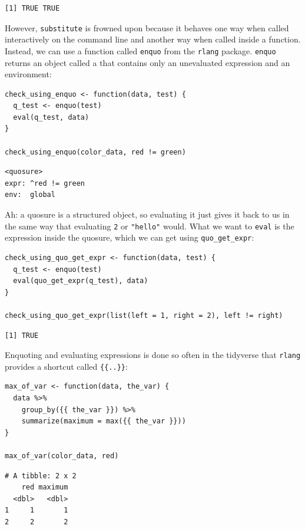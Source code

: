 \begin{lstlisting}
[1] TRUE TRUE
\end{lstlisting}

\noindent
However,
\texttt{substitute} is frowned upon because it behaves one way when called interactively on the command line
and another way when called inside a function.
Instead,
we can use a function called \texttt{enquo} from the \texttt{rlang} package.
\texttt{enquo} returns an object called a 
that contains only an unevaluated expression and an environment:

\begin{lstlisting}
check_using_enquo <- function(data, test) {
  q_test <- enquo(test)
  eval(q_test, data)
}

check_using_enquo(color_data, red != green)
\end{lstlisting}

\begin{lstlisting}
<quosure>
expr: ^red != green
env:  global
\end{lstlisting}

\noindent
Ah: a quosure is a structured object,
so evaluating it just gives it back to us in the same way that evaluating \texttt{2} or \texttt{"hello"} would.
What we want to \texttt{eval} is the expression inside the quosure,
which we can get using \texttt{quo\_get\_expr}:

\begin{lstlisting}
check_using_quo_get_expr <- function(data, test) {
  q_test <- enquo(test)
  eval(quo_get_expr(q_test), data)
}

check_using_quo_get_expr(list(left = 1, right = 2), left != right)
\end{lstlisting}

\begin{lstlisting}
[1] TRUE
\end{lstlisting}

Enquoting and evaluating expressions is done so often in the tidyverse
that \texttt{rlang} provides a shortcut called \texttt{\{\{..\}\}}:

\begin{lstlisting}
max_of_var <- function(data, the_var) {
  data %>%
    group_by({{ the_var }}) %>%
    summarize(maximum = max({{ the_var }}))
}

max_of_var(color_data, red)
\end{lstlisting}

\begin{lstlisting}
# A tibble: 2 x 2
    red maximum
  <dbl>   <dbl>
1     1       1
2     2       2
\end{lstlisting}

